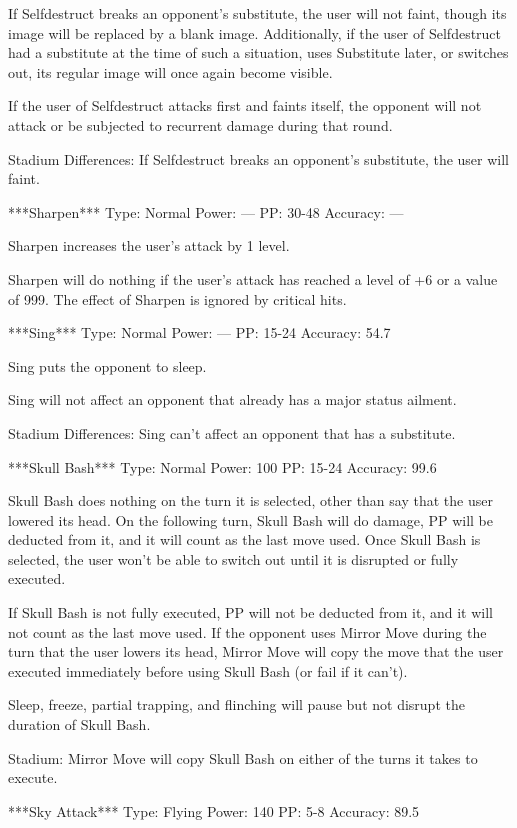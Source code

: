 \documentclass[reprint, aps, prl, paper=A4]{revtex4-1}
\begin{document}
If Selfdestruct breaks an opponent's substitute, the user will not faint, though its image will
be replaced by a blank image. Additionally, if the user of Selfdestruct had a substitute at the
time of such a situation, uses Substitute later, or switches out, its regular image will once
again become visible.

If the user of Selfdestruct attacks first and faints itself, the opponent will not attack or be
subjected to recurrent damage during that round.

Stadium Differences:
If Selfdestruct breaks an opponent's substitute, the user will faint.


***Sharpen***
Type: Normal
Power: ---
PP: 30-48
Accuracy: ---

Sharpen increases the user's attack by 1 level.

Sharpen will do nothing if the user's attack has reached a level of +6 or a value of 999. The
effect of Sharpen is ignored by critical hits.


***Sing***
Type: Normal
Power: ---
PP: 15-24
Accuracy: 54.7%

Sing puts the opponent to sleep.

Sing will not affect an opponent that already has a major status ailment.

Stadium Differences:
Sing can't affect an opponent that has a substitute.


***Skull Bash***
Type: Normal
Power: 100
PP: 15-24
Accuracy: 99.6%

Skull Bash does nothing on the turn it is selected, other than say that the user lowered its
head. On the following turn, Skull Bash will do damage, PP will be deducted from it, and it
will count as the last move used. Once Skull Bash is selected, the user won't be able to switch
out until it is disrupted or fully executed.

If Skull Bash is not fully executed, PP will not be deducted from it, and it will not count as
the last move used. If the opponent uses Mirror Move during the turn that the user lowers its
head, Mirror Move will copy the move that the user executed immediately before using Skull Bash
(or fail if it can't).

Sleep, freeze, partial trapping, and flinching will pause but not disrupt the duration of Skull
Bash.

Stadium:
Mirror Move will copy Skull Bash on either of the turns it takes to execute.


***Sky Attack***
Type: Flying
Power: 140
PP: 5-8
Accuracy: 89.5%
\end{document}

